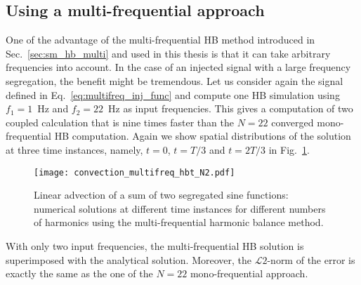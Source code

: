 \subsection{Using a multi-frequential approach}

One of the advantage of the multi-frequential HB method introduced in Sec.~\ref{sec:sm_hb_multi}
and used in this thesis is that it can take arbitrary frequencies into account.
In the case of an injected signal with a large frequency segregation, the
benefit might be tremendous. Let us consider again the signal defined in 
Eq.~\eqref{eq:multifreq_inj_func} and compute one HB simulation using 
$f_1=1$~Hz and $f_2=22$~Hz as input frequencies. This gives a computation
of two coupled calculation
that is nine times faster than the $N=22$ converged mono-frequential
HB computation.
Again
we show spatial distributions of the solution
at three time instances, namely, $t=0$, $t=T/3$ and $t=2T/3$
in Fig.~\ref{fig:inj_multifreq_hb}.
\begin{figure}
  \centering
  \texttt{[image: convection\_multifreq\_hbt\_N2.pdf]}
  \caption{Linear advection of a sum of two segregated sine functions: 
  numerical solutions at different time instances for different numbers of harmonics using the
  multi-frequential harmonic balance method.}
  \label{fig:inj_multifreq_hb}
\end{figure}
With only two input frequencies, the multi-frequential
HB solution is superimposed with the analytical solution.
Moreover, the $\mathcal{L}2$-norm of the error is 
exactly the same as the one of the $N=22$ mono-frequential
approach.
